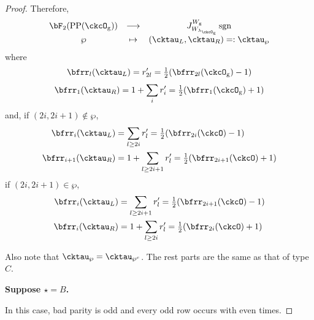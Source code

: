 \documentclass[12pt,a4paper]{amsart}
\newcommand{\sgn}{\operatorname{sgn}}
\numberwithin{equation}{section}
\theoremstyle{remark}
\def\half{{\tfrac{1}{2}}}
\def\lamckg{\lambda_{\ckcO_{\mathrm g}}}
\def\CPP{\mathrm{PP}}
\begin{document}
\begin{proof}
{      Therefore,
      \[
        \begin{array}{ccc}
          \bF_{2}(\CPP(\ckcO_{\mathrm g}))&\longrightarrow
          & J_{W_{\lamckg}}^{W_{\mathrm g}} \sgn \\
          \wp&\mapsto&    (\cktau_{L},\cktau_{R}) =:\cktau_{\wp}
        \end{array}
      \]
      where
      \[
        \bfrr_{l}(\cktau_{L}) = r'_{2l} = \half (\bfrr_{2l}(\ckcO_{\mathrm g})-1)
      \]
      \[
        \bfrr_{1}(\cktau_{R}) = 1+ \sum_{i} r'_{i} = \half (\bfrr_{1}(\ckcO_{\mathrm g})+1)
      \]
      and, if $(2i,2i+1)\notin \wp$,
      \[
        \begin{split}
          \bfrr_{i}(\cktau_{L}) & = \sum_{l\geq 2i} r'_{l}
          = \half(\bfrr_{2i}(\ckcO)-1)\\
          \bfrr_{i+1}(\cktau_{R}) & = 1 + \sum_{l\geq 2i+1} r'_{l} = \half(\bfrr_{2i+1}(\ckcO)+1)
        \end{split}
      \]
      if $(2i,2i+1)\in \wp$,
      \[
        \begin{split}
          \bfrr_{i}(\cktau_{L}) & = \sum_{l\geq 2i+1} r'_{l}
          = \half(\bfrr_{2i+1}(\ckcO)-1)\\
          \bfrr_{i}(\cktau_{R}) & = 1 + \sum_{l\geq 2i} r'_{l} = \half(\bfrr_{2i}(\ckcO)+1)
        \end{split}
      \]

      Also note that $\cktau_{\wp}=\cktau_{\wp^{c}}$. The rest parts are the
      same as that of type $C$.

      {\bf Suppose $\star=B$. }

      In this case, bad parity is odd and every odd row occurs with even
      times.

}
\end{proof}
\end{document}
